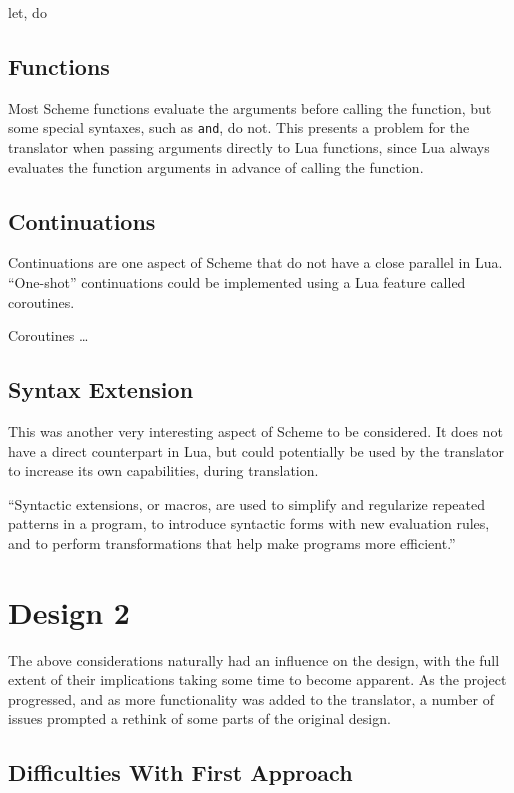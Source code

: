 let, do

\subsection{Functions}

Most Scheme functions evaluate the arguments before calling the function, but
some special syntaxes, such as \texttt{and}, do not. This presents a problem
for the translator when passing arguments directly to Lua functions, since Lua
always evaluates the function arguments in advance of calling the function.


\subsection{Continuations}

Continuations are one aspect of Scheme that do not have a close parallel in
Lua. ``One-shot'' continuations could be implemented using a Lua feature called
coroutines.

Coroutines \ldots

\subsection{Syntax Extension}

This was another very interesting aspect of Scheme to be considered. It does not
have a direct counterpart in Lua, but could potentially be used by the
translator to increase its own capabilities, during translation.

``Syntactic extensions, or macros, are used to simplify and regularize repeated
patterns in a program, to introduce syntactic forms with new evaluation rules,
and to perform transformations that help make programs more
efficient.''~\cite[Ch~8]{tspl}


\section{Design 2}

The above considerations naturally had an influence on the design, with the full
extent of their implications taking some time to become apparent. As the
project progressed, and as more functionality was added to the translator, a
number of issues prompted a rethink of some parts of the original design.

\subsection{Difficulties With First Approach}

